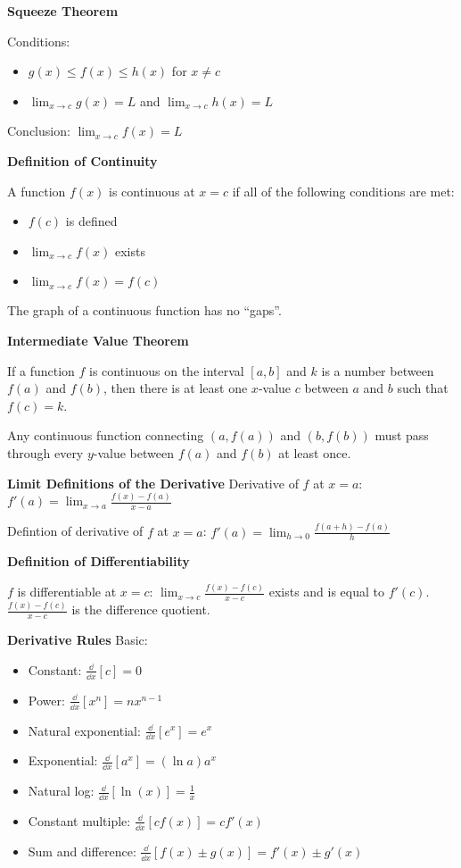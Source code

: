 \documentclass[10pt,a4paper,oneside]{book}
\begin{document}
\textbf{Squeeze Theorem}

Conditions: 
\begin{itemize}
    \item $g(x)\leq f(x)\leq h(x)$ for $x\neq c$
    \item $\lim_{x\to c}g(x)=L$ and $\lim_{x\to c}h(x)=L$
\end{itemize}

Conclusion: $\lim_{x\to c}f(x)=L$

\textbf{Definition of Continuity}

A function $f(x)$ is continuous at $x=c$ if all of the following conditions are met:
\begin{itemize}
    \item $f(c)$ is defined
    \item $\lim_{x\to c}f(x)$ exists 
    \item $\lim_{x\to c}f(x)=f(c)$
\end{itemize}
The graph of a continuous function has no ``gaps''.

\textbf{Intermediate Value Theorem}

If a function $f$ is continuous on the interval $[a,b]$ and $k$ is a number between $f(a)$ and $f(b)$, then there is at least one $x$-value $c$ between $a$ and $b$ 
such that $f(c)=k$.

Any continuous function connecting $(a,f(a))$ and $(b,f(b))$ must pass through every $y$-value between $f(a)$ and $f(b)$ at least once.

\textbf{Limit Definitions of the Derivative}
Derivative of $f$ at $x=a$: $f'(a)=\lim_{x\to a}\frac{f(x)-f(a)}{x-a}$

Defintion of derivative of $f$ at $x=a$: $f'(a)=\lim_{h\to 0}\frac{f(a+h)-f(a)}{h}$

\textbf{Definition of Differentiability}

$f$ is differentiable at $x=c$: $\lim_{x\to c}\frac{f(x)-f(c)}{x-c}$ exists and is equal to $f'(c)$. $\frac{f(x)-f(c)}{x-c}$ is the difference quotient.

\textbf{Derivative Rules}
Basic:
\begin{itemize}
    \item Constant: $\frac{\dd}{\dd x}[c]=0$
    \item Power: $\frac{\dd}{\dd x}[x^n]=nx^{n-1}$
    \item Natural exponential: $\frac{\dd}{\dd x}[e^x]=e^x$
    \item Exponential: $\frac{\dd}{\dd x}[a^x]=(\ln a)a^x$
    \item Natural log: $\frac{\dd}{\dd x}[\ln(x)]=\frac{1}{x}$
    \item Constant multiple: $\frac{\dd}{\dd x}[cf(x)]=cf'(x)$
    \item Sum and difference: $\frac{\dd}{\dd x}[f(x)\pm g(x)]=f'(x)\pm g'(x)$
\end{itemize}
\end{document}
